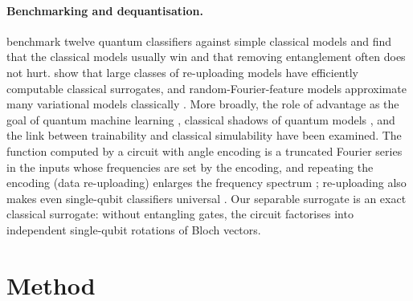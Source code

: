 \documentclass[11pt]{article}
\begin{document}
\paragraph{Benchmarking and dequantisation.}
\citet{bowles2024better} benchmark twelve quantum classifiers against simple
classical models and find that the classical models usually win and that
removing entanglement often does not hurt. \citet{schreiber2023surrogates} show
that large classes of re-uploading models have efficiently computable classical
surrogates, and random-Fourier-feature models approximate many variational
models classically \citep{landman2023rff}. More broadly, the role of advantage as
the goal of quantum machine learning \citep{schuld2022advantage}, classical
shadows of quantum models \citep{jerbi2024shadows}, and the link between
trainability and classical simulability \citep{cerezo2023simulability} have been
examined. The function computed by a circuit with angle encoding is a truncated
Fourier series in the inputs whose frequencies are set by the encoding, and
repeating the encoding (data re-uploading) enlarges the frequency spectrum
\citep{schuld2021encoding}; re-uploading also makes even single-qubit
classifiers universal \citep{perezsalinas2020reuploading}. Our separable
surrogate is an exact classical surrogate: without entangling gates, the circuit
factorises into independent single-qubit rotations of Bloch vectors.

\section{Method}
\label{sec:method}
\end{document}
